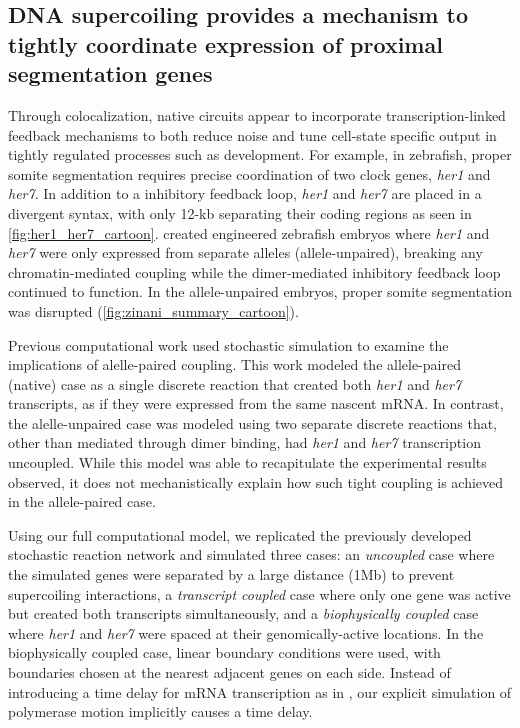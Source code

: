 \documentclass[11pt]{article}
\begin{document}
\subsection{DNA supercoiling provides a mechanism to tightly coordinate expression of proximal segmentation genes}
Through colocalization, native circuits appear to incorporate transcription-linked feedback mechanisms to both reduce noise and tune cell-state specific output in tightly regulated processes such as development. For example, in zebrafish, proper somite segmentation requires precise coordination of two clock genes, \textit{her1} and \textit{her7}. In addition to a inhibitory feedback loop, \textit{her1} and \textit{her7} are placed in a divergent syntax, with only 12-kb separating their coding regions as seen in \cref{fig:her1_her7_cartoon}. \Textcite{zinaniPairingSegmentationClock2021} created engineered zebrafish embryos where \emph{her1} and \emph{her7} were only expressed from separate alleles (allele-unpaired), breaking any chromatin-mediated coupling while the dimer-mediated inhibitory feedback loop continued to function. In the allele-unpaired embryos, proper somite segmentation was disrupted (\cref{fig:zinani_summary_cartoon}).

Previous computational work used stochastic simulation to examine the implications of alelle-paired coupling.\parencite{zinaniPairingSegmentationClock2021} This work modeled the allele-paired (native) case as a single discrete reaction that created both \textit{her1} and \textit{her7} transcripts, as if they were expressed from the same nascent mRNA. In contrast, the alelle-unpaired case was modeled using two separate discrete reactions that, other than mediated through dimer binding, had \textit{her1} and \textit{her7} transcription uncoupled.
While this model was able to recapitulate the experimental results observed, it does not mechanistically explain how such tight coupling is achieved in the allele-paired case.

Using our full computational model, we replicated the previously developed stochastic reaction network and simulated three cases: an \emph{uncoupled} case where the simulated genes were separated by a large distance (1Mb) to prevent supercoiling interactions, a \emph{transcript coupled} case where only one gene was active but created both transcripts simultaneously, and a \emph{biophysically coupled} case where \textit{her1} and \textit{her7} were spaced at their genomically-active locations. In the biophysically coupled case, linear boundary conditions were used, with boundaries chosen at the nearest adjacent genes on each side. Instead of introducing a time delay for mRNA transcription as in \parencite{zinaniPairingSegmentationClock2021}, our explicit simulation of polymerase motion implicitly causes a time delay.
\end{document}
